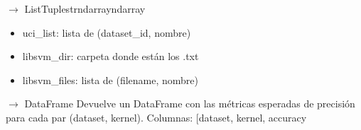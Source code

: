 \documentclass[letterpaper,10pt,english]{sphinxmanual}
\begin{document}
\begin{fulllineitems}
\label{\detokenize{Data:Data.loader.load_all_datasets}}
\pysigstartsignatures
\pysiglinewithargsret
{}
{\sphinxparamcomma {}\sphinxparamcomma {}}
{{ $\rightarrow$ List\DUrole{p}{{[}}Tuple\DUrole{p}{{[}}strndarrayndarray\DUrole{p}{{]}}\DUrole{p}{{]}}}}
\pysigstopsignatures\begin{description}
\begin{itemize}
\item {} 
\sphinxAtStartPar
uci\_list: lista de (dataset\_id, nombre)

\item {} 
\sphinxAtStartPar
libsvm\_dir: carpeta donde están los .txt

\item {} 
\sphinxAtStartPar
libsvm\_files: lista de (filename, nombre)

\end{itemize}

\end{description}

\end{fulllineitems}


\begin{fulllineitems}
\label{\detokenize{Data:Data.loader.load_expected_results}}
\pysigstartsignatures
\pysiglinewithargsret
{}
{}
{{ $\rightarrow$ DataFrame}}
\pysigstopsignatures
\sphinxAtStartPar
Devuelve un DataFrame con las métricas esperadas de precisión para cada
par (dataset, kernel).
Columnas: {[}\textquotesingle{}dataset\textquotesingle{}, \textquotesingle{}kernel\textquotesingle{}, \textquotesingle{}accuracy\textquotesingle{}{]}

\end{fulllineitems}
\end{document}
